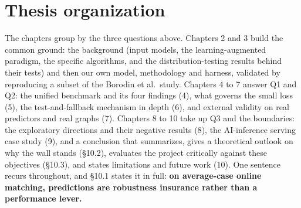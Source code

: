 \section{Thesis organization}

The chapters group by the three questions above. Chapters 2 and 3 build
the common ground: the background (input models, the learning-augmented
paradigm, the specific algorithms, and the distribution-testing results
behind their tests) and then our own model, methodology and harness,
validated by reproducing a subset of the Borodin et al.~study. Chapters
4 to 7 answer Q1 and Q2: the unified benchmark and its four findings
(4), what governs the small loss (5), the test-and-fallback mechanism in
depth (6), and external validity on real predictors and real graphs (7).
Chapters 8 to 10 take up Q3 and the boundaries: the exploratory
directions and their negative results (8), the AI-inference serving case
study (9), and a conclusion that summarizes, gives a theoretical outlook
on why the wall stands (§10.2), evaluates the project critically against
these objectives (§10.3), and states limitations and future work (10).
One sentence recurs throughout, and §10.1 states it in full: \textbf{on
average-case online matching, predictions are robustness insurance
rather than a performance lever.}
